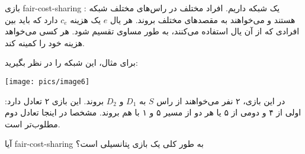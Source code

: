 بازی
fair-cost-sharing
:
یک شبکه داریم. افراد مختلف در راس‌های مختلف شبکه هستند و می‌خواهند به مقصد‌های مختلف بروند. هر یال
$e$
یک هزینه
$c_e$
دارد که باید بین افرادی که از آن یال استفاده می‌کنند، به طور مساوی تقسیم شود. هر کسی می‌خواهد هزینه خود را کمینه کند.

برای مثال، این شبکه را در نظر بگیرید:
\begin{center}
    \texttt{[image: pics/image6]}
\end{center}
در این بازی، ۲ نفر می‌خواهند از راس
$S$
به
$D_1$
و
$D_2$
بروند. این بازی ۲ تعادل دارد: اولی از ۴ و دومی از ۵ یا هر دو از مسیر ۵ و ۱ با هم بروند. مشخصا در اینجا تعادل دوم مطلوب‌تر است.

آیا
fair-cost-sharing
به طور کلی یک بازی پتانسیلی است؟